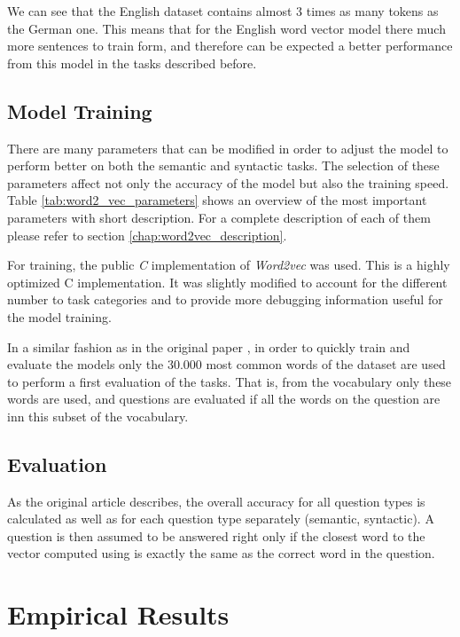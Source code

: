  

We can see that the English dataset contains almost 3 times as many tokens as the
German one. This means that for the English word vector model  there much more
sentences to train form, and therefore can be expected a better performance
from this model in the tasks described before. 
   
\subsection{Model Training}
\label{experiments:sub:Training}

There are many parameters that can be modified in order to adjust the model
to  perform better on both the  semantic and syntactic tasks. The
selection of these  parameters affect not only the accuracy of the model but
also the training speed.  Table \ref{tab:word2_vec_parameters} shows an
overview of the most important parameters with short description. For a
complete description of each of them please refer to section \ref{chap:word2vec_description}.

For training,  the public \emph{C} implementation  of
\textit{Word2vec}  was
used.  This is a highly optimized C implementation. It was slightly modified to account for the different
number to task categories and to provide more debugging information useful
for the model training. 

In a similar fashion as in the original paper
\cite{DBLP:journals/corr/abs-1301-3781}, in order to quickly train and evaluate the models
only the 30.000 most common words of the dataset are used to perform a first
evaluation of the tasks. That is, from the vocabulary only these words are
used, and questions are evaluated if all the words on the question are inn
this subset of the vocabulary.

\subsection{Evaluation}
\label{experiments:sub:evaluation}

As  the original article describes, the overall accuracy for all question
types is calculated as well as  for each question type separately (semantic,
syntactic). A question is then assumed to be answered right  only if the
closest word to the vector computed using  is exactly the same as the correct word in the
question. 
 
\section{Empirical Results}
\label{sec:sub_empirical_results}

